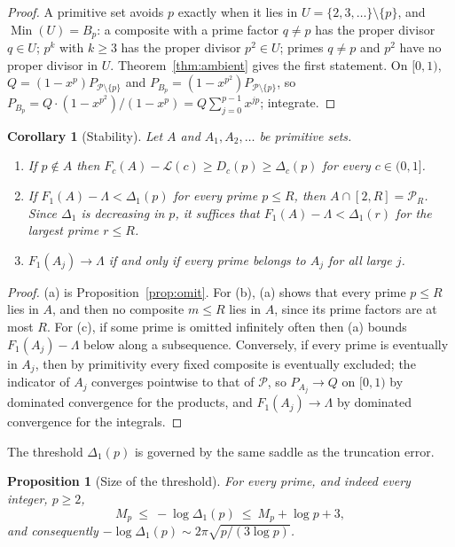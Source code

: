 \documentclass[11pt]{article}
\newtheorem{proposition}[theorem]{Proposition}
\newtheorem{corollary}[theorem]{Corollary}
\theoremstyle{remark}
\newcommand{\Prm}{\mathcal{P}}
\begin{document}
\begin{proof}
A primitive set avoids $p$ exactly when it lies in
$U=\{2,3,\dots\}\setminus\{p\}$, and $\operatorname{Min}(U)=B_p$: a
composite with a prime factor $q\ne p$ has the proper divisor $q\in U$;
$p^k$ with $k\ge3$ has the proper divisor $p^2\in U$; primes $q\ne p$ and
$p^2$ have no proper divisor in $U$. Theorem~\ref{thm:ambient} gives the
first statement. On $[0,1)$, $Q=(1-x^p)P_{\Prm\setminus\{p\}}$ and
$P_{B_p}=(1-x^{p^2})P_{\Prm\setminus\{p\}}$, so
$P_{B_p}=Q\cdot(1-x^{p^2})/(1-x^p)=Q\sum_{j=0}^{p-1}x^{jp}$; integrate.
\end{proof}

\begin{corollary}[Stability]\label{cor:stability}
Let $A$ and $A_1,A_2,\dots$ be primitive sets.
\begin{enumerate}
\item[(a)] If $p\notin A$ then $F_c(A)-\mathcal L(c)\ge D_c(p)\ge\Delta_c(p)$
  for every $c\in(0,1]$.
\item[(b)] If $F_1(A)-\Lambda<\Delta_1(p)$ for every prime $p\le R$, then
  $A\cap[2,R]=\Prm_R$. Since $\Delta_1$ is decreasing in $p$, it suffices
  that $F_1(A)-\Lambda<\Delta_1(r)$ for the largest prime $r\le R$.
\item[(c)] $F_1(A_j)\to\Lambda$ if and only if every prime belongs to $A_j$
  for all large $j$.
\end{enumerate}
\end{corollary}

\begin{proof}
(a) is Proposition~\ref{prop:omit}. For (b), (a) shows that every prime
$p\le R$ lies in $A$, and then no composite $m\le R$ lies in $A$, since
its prime factors are at most $R$. For (c), if some prime is omitted
infinitely often then (a) bounds $F_1(A_j)-\Lambda$ below along a
subsequence. Conversely, if every prime is eventually in $A_j$, then by
primitivity every fixed composite is eventually excluded; the indicator
of $A_j$ converges pointwise to that of $\Prm$, so $P_{A_j}\to Q$ on
$[0,1)$ by dominated convergence for the products, and $F_1(A_j)\to\Lambda$
by dominated convergence for the integrals.
\end{proof}

The threshold $\Delta_1(p)$ is governed by the same saddle as the
truncation error.

\begin{proposition}[Size of the threshold]\label{prop:delta}
For every prime, and indeed every integer, $p\ge2$,
\[
  M_p\ \le\ -\log\Delta_1(p)\ \le\ M_p+\log p+3,
\]
and consequently $-\log\Delta_1(p)\sim2\pi\sqrt{p/(3\log p)}$.
\end{proposition}
\end{document}
